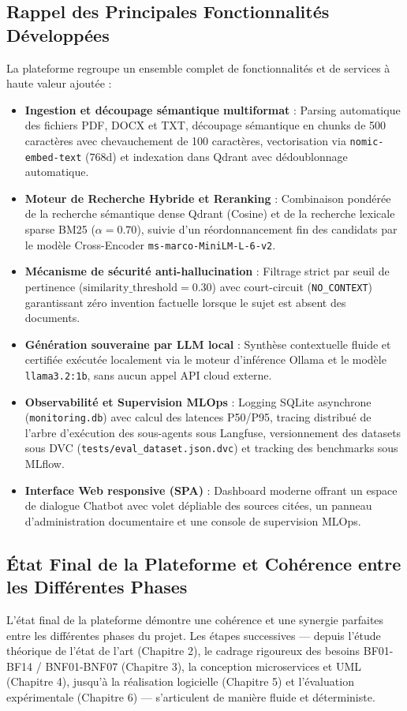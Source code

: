 \subsection*{Rappel des Principales Fonctionnalités Développées}
La plateforme regroupe un ensemble complet de fonctionnalités et de services à haute valeur ajoutée :
\begin{itemize}
    \item \textbf{Ingestion et découpage sémantique multiformat} : Parsing automatique des fichiers PDF, DOCX et TXT, découpage sémantique en chunks de 500 caractères avec chevauchement de 100 caractères, vectorisation via \texttt{nomic-embed-text} ($768$d) et indexation dans Qdrant avec dédoublonnage automatique.
    \item \textbf{Moteur de Recherche Hybride et Reranking} : Combinaison pondérée de la recherche sémantique dense Qdrant (Cosine) et de la recherche lexicale sparse BM25 ($\alpha=0.70$), suivie d'un réordonnancement fin des candidats par le modèle Cross-Encoder \texttt{ms-marco-MiniLM-L-6-v2}.
    \item \textbf{Mécanisme de sécurité anti-hallucination} : Filtrage strict par seuil de pertinence ($\text{similarity\_threshold} = 0.30$) avec court-circuit (\texttt{NO\_CONTEXT}) garantissant zéro invention factuelle lorsque le sujet est absent des documents.
    \item \textbf{Génération souveraine par LLM local} : Synthèse contextuelle fluide et certifiée exécutée localement via le moteur d'inférence Ollama et le modèle \texttt{llama3.2:1b}, sans aucun appel API cloud externe.
    \item \textbf{Observabilité et Supervision MLOps} : Logging SQLite asynchrone (\texttt{monitoring.db}) avec calcul des latences P50/P95, tracing distribué de l'arbre d'exécution des sous-agents sous Langfuse, versionnement des datasets sous DVC (\texttt{tests/eval\_dataset.json.dvc}) et tracking des benchmarks sous MLflow.
    \item \textbf{Interface Web responsive (SPA)} : Dashboard moderne offrant un espace de dialogue Chatbot avec volet dépliable des sources citées, un panneau d'administration documentaire et une console de supervision MLOps.
\end{itemize}

\subsection*{État Final de la Plateforme et Cohérence entre les Différentes Phases}
L'état final de la plateforme démontre une cohérence et une synergie parfaites entre les différentes phases du projet. Les étapes successives — depuis l'étude théorique de l'état de l'art (Chapitre 2), le cadrage rigoureux des besoins BF01-BF14 / BNF01-BNF07 (Chapitre 3), la conception microservices et UML (Chapitre 4), jusqu'à la réalisation logicielle (Chapitre 5) et l'évaluation expérimentale (Chapitre 6) — s'articulent de manière fluide et déterministe. 

